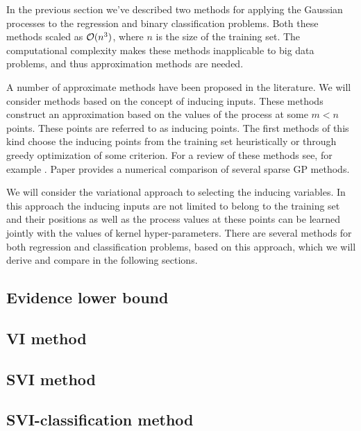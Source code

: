 \label{inducing_input_methods}
In the previous section we've described two methods for applying the Gaussian processes to the regression and binary classification problems. Both these methods scaled as $\mathcal{O}(n^3)$, where $n$ is the size of the training set. The computational complexity makes these methods inapplicable to big data problems, and thus approximation methods are needed.

A number of approximate methods have been proposed in the literature. We will consider methods based on the concept of inducing inputs. These methods construct an approximation based on the values of the process at some $m < n$ points. These points are referred to as inducing points. The first methods of this kind choose the inducing points from the training set heuristically or through greedy optimization of some criterion. For a review of these methods see, for example \cite{OldSparseMethods}. Paper \cite{SparseExperiments} provides a numerical comparison of several sparse GP methods.

We will consider the variational approach to selecting the inducing variables. In this approach the inducing inputs are not limited to belong to the training set and their positions as well as the process values at these points can be learned jointly with the values of kernel hyper-parameters. There are several methods for both regression and classification problems, based on this approach, which we will derive and compare in the following sections.

\subsection{Evidence lower bound}
	
\subsection{VI method}
	
\subsection{SVI method}
	
\subsection{SVI-classification method}
	
